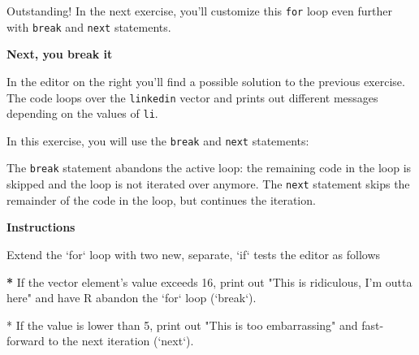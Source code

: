 \documentclass[]{article}
\newcommand{\hlstr}[1]{\textcolor[rgb]{0.251,0.627,0.251}{#1}}%
\newcommand{\hlstd}[1]{\textcolor[rgb]{0.251,0.251,0.251}{#1}}%
\newcommand{\hlkwc}[1]{\textcolor[rgb]{0.251,0.251,0.251}{#1}}%
\newenvironment{Shaded}{\begin{myshaded}}{\end{myshaded}}
\newcommand{\DataTypeTok}[1]{\hlkwc{#1}}
\newcommand{\StringTok}[1]{\hlstr{#1}}
\newcommand{\ErrorTok}[1]{\textbf{{#1}}}
\newcommand{\NormalTok}[1]{\hlstd{#1}}
\begin{document}
Outstanding! In the next exercise, you'll customize this \texttt{for}
loop even further with \texttt{break} and \texttt{next} statements.

\textbf{Next, you break it}

In the editor on the right you'll find a possible solution to the
previous exercise. The code loops over the \texttt{linkedin} vector and
prints out different messages depending on the values of \texttt{li}.

In this exercise, you will use the \texttt{break} and \texttt{next}
statements:

The \texttt{break} statement abandons the active loop: the remaining
code in the loop is skipped and the loop is not iterated over anymore.
The \texttt{next} statement skips the remainder of the code in the loop,
but continues the iteration.

\textbf{Instructions}

\begin{Shaded}
\begin{Highlighting}[]
\NormalTok{Extend the }\StringTok{`}\DataTypeTok{for}\StringTok{`}\NormalTok{ loop with two new, separate, }\StringTok{`}\DataTypeTok{if}\StringTok{`}\NormalTok{ tests }\NormalTok{ the editor as follows}\OperatorTok{:}

\ErrorTok{*}\StringTok{ }\NormalTok{If the vector element}\StringTok{'s value exceeds 16, print out "This is ridiculous, I'}\NormalTok{m outta here}\OperatorTok{!}\StringTok{" and have R abandon the `for` loop (`break`).}

\StringTok{* If the value is lower than 5, print out "}\NormalTok{This is too embarrassing}\OperatorTok{!}\StringTok{" and fast-forward to the next iteration (`next`).}
\end{Highlighting}
\end{Shaded}
\end{document}
